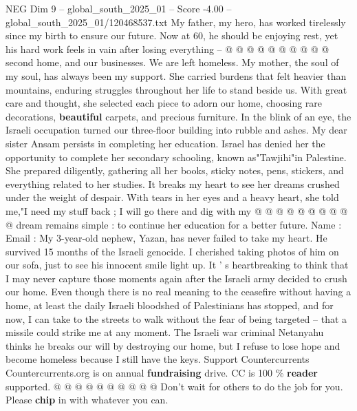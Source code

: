 \begin{textsample}{NEG Dim 9 – global\_south\_2025\_01 – Score -4.00 – global\_south\_2025\_01/120468537.txt}
My father, my hero, has worked tirelessly since my birth to ensure our future.
Now at 60, he should be enjoying rest, yet his hard work feels in vain after losing everything -- @ @ @ @ @ @ @ @ @ @ second home, and our businesses.
We are left homeless.
My mother, the soul of my soul, has always been my support.
She carried burdens that felt heavier than mountains, enduring struggles throughout her life to stand beside us.
With great care and thought, she selected each piece to adorn our home, choosing rare decorations, \textbf{beautiful} carpets, and precious furniture.
In the blink of an eye, the Israeli occupation turned our three-floor building into rubble and ashes.
My dear sister Ansam persists in completing her education.
Israel has denied her the opportunity to complete her secondary schooling, known as"Tawjihi"in Palestine.
She prepared diligently, gathering all her books, sticky notes, pens, stickers, and everything related to her studies.
It breaks my heart to see her dreams crushed under the weight of despair.
With tears in her eyes and a heavy heart, she told me,"I need my stuff back ; I will go there and dig with my @ @ @ @ @ @ @ @ @ @ dream remains simple : to continue her education for a better future.
Name : Email : My 3-year-old nephew, Yazan, has never failed to take my heart.
He survived 15 months of the Israeli genocide.
I cherished taking photos of him on our sofa, just to see his innocent smile light up.
It ' s heartbreaking to think that I may never capture those moments again after the Israeli army decided to crush our home.
Even though there is no real meaning to the ceasefire without having a home, at least the daily Israeli bloodshed of Palestinians has stopped, and for now, I can take to the streets to walk without the fear of being targeted -- that a missile could strike me at any moment.
The Israeli war criminal Netanyahu thinks he breaks our will by destroying our home, but I refuse to lose hope and become homeless because I still have the keys.
Support Countercurrents Countercurrents.org is on annual \textbf{fundraising} drive.
CC is 100 \% \textbf{reader} supported. @ @ @ @ @ @ @ @ @ @ Don't wait for others to do the job for you.
Please \textbf{chip} in with whatever you can.

\end{textsample}
